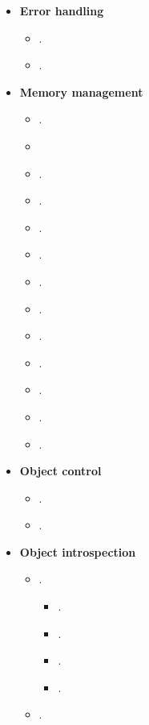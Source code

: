   \begin{itemize}
  \item\textbf{Error handling}
    \begin{itemize}
    \item\GCGTestForException.
    \item\GCGStandardCatchStatements.
    \end{itemize}
  \item\textbf{Memory management}
    \begin{itemize}
    \item\GCGAvoidRawPointers.
    \item\GCGUseStdString
    \item\GCGTeuchosPtr.
    \item\GCGTeuchosRCP.
    \item\GCGNonmemberConstructors.
    \item\GCGGeneralizedViews.
    \item\GCGTeuchosArrayView.
    \item\GCGTeuchosArray.
    \item\GCGTeuchosArrayRCP.
    \item\GCGReturnSmartPointersByValue.
    \item\GCGRawReferencesNonPersisting.
    \item\GCGSemiPersisting.
    \item\GCGPostponeRawPointers.
    \end{itemize}
  \item\textbf{Object control}
    \begin{itemize}
    \item\GCGTeuchosParamterListAcceptor.
    \item\GCGTeuchosParamterListValidation.
    \end{itemize}
  \item\textbf{Object introspection}
    \begin{itemize}
    \item\GCGStdStream.
      \begin{itemize}
      \item\GCGTeuchosFancyOStream.
      \item\GCGTeuchosDescribable.
      \item\GCGTeuchosVerboseObject.
      \item\GCGTeuchosVerboseObjectBaseDefaultOStream.
      \end{itemize}
    \item\GCGTeuchosTimers.
    \end{itemize}

\end{itemize}
